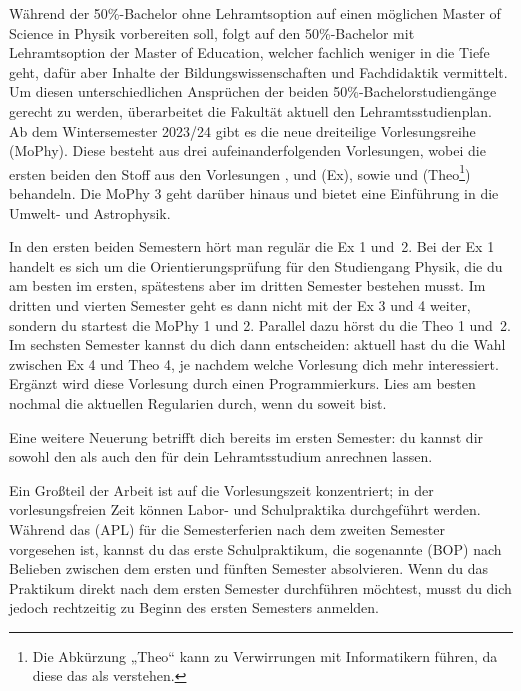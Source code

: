 Während der 50\%-Bachelor ohne Lehramtsoption auf einen möglichen Master of Science in Physik vorbereiten soll, folgt auf den 50\%-Bachelor mit Lehramtsoption der Master of Education, welcher fachlich weniger in die Tiefe geht, dafür aber Inhalte der Bildungswissenschaften und Fachdidaktik vermittelt. Um diesen unterschiedlichen Ansprüchen der beiden 50\%-Bachelorstudiengänge gerecht zu werden, überarbeitet die Fakultät aktuell den Lehramtsstudienplan. Ab dem Wintersemester 2023/24 gibt es die neue dreiteilige Vorlesungsreihe  (\gls{MoPhy}). Diese besteht aus drei aufeinanderfolgenden Vorlesungen, wobei die ersten beiden den Stoff aus den Vorlesungen ,  und  (\gls{Ex}), sowie  und  (\gls{Theo}\footnote{Die Abkürzung „Theo“ kann zu Verwirrungen mit Informatikern führen, da diese das als  verstehen.}) behandeln. Die \gls{MoPhy} 3 geht darüber hinaus und bietet eine Einführung in die Umwelt- und Astrophysik.

In den ersten beiden Semestern hört man regulär die Ex 1 und~2. Bei der Ex 1 handelt es sich um die Orientierungsprüfung für den Studiengang Physik, die du am besten im ersten, spätestens aber im dritten Semester bestehen musst. Im dritten und vierten Semester geht es dann nicht mit der Ex 3 und 4 weiter, sondern du startest die MoPhy 1 und 2. Parallel dazu hörst du die Theo 1 und~2. Im sechsten Semester kannst du dich dann entscheiden: aktuell hast du die Wahl zwischen Ex 4 und Theo 4, je nachdem welche Vorlesung dich mehr interessiert. Ergänzt wird diese Vorlesung durch einen Programmierkurs. Lies am besten nochmal die aktuellen Regularien durch, wenn du soweit bist.

Eine weitere Neuerung betrifft dich bereits im ersten Semester: du kannst dir sowohl den  als auch den  für dein Lehramtsstudium anrechnen lassen. 

Ein Großteil der Arbeit ist auf die Vorlesungszeit konzentriert; in der vorlesungsfreien Zeit können Labor- und Schulpraktika durchgeführt werden. Während das  (APL) für die Semesterferien nach dem zweiten Semester vorgesehen ist, kannst du das erste Schulpraktikum, die sogenannte  (\gls{BOP}) nach Belieben zwischen dem ersten und fünften Semester absolvieren. Wenn du das Praktikum direkt nach dem ersten Semester durchführen möchtest, musst du dich jedoch rechtzeitig zu Beginn des ersten Semesters anmelden.

